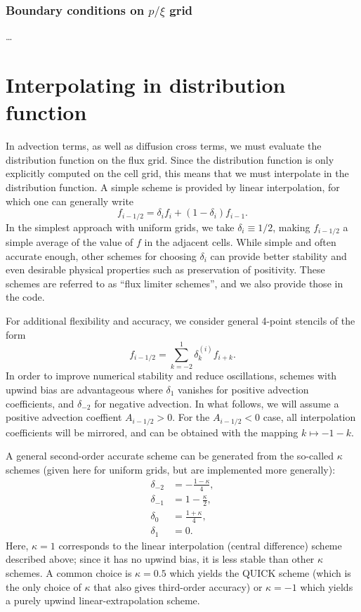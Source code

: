 \documentclass{notes}
\begin{document}
	\subsubsection{Boundary conditions on $p/\xi$ grid}
	\ldots

    \section{Interpolating in distribution function}\label{sec:interp}
    In advection terms, as well as diffusion cross terms, we must evaluate the
    distribution function on the flux grid. Since the distribution function is
    only explicitly computed on the cell grid, this means that we must
    interpolate in the distribution function. A simple scheme is provided by 
    linear interpolation, for which one can generally write
    \begin{equation}
        f_{i-1/2} = \delta_{i} f_i + \left( 1 - \delta_i \right) f_{i-1}.
    \end{equation}
    In the simplest approach with uniform grids, we take $\delta_i\equiv 1/2$, making $f_{i-1/2}$
    a simple average of the value of $f$ in the adjacent cells. While simple and
    often accurate enough, other schemes for choosing $\delta_i$ can provide
    better stability and even desirable physical properties such as preservation
    of positivity. These schemes are referred to as ``flux limiter schemes'',
    and we also provide those in the code.
    
    For additional flexibility and accuracy, we consider general 4-point stencils of the form
    \begin{equation}
    	f_{i-1/2} = \sum_{k=-2}^1 \delta^{(i)}_k f_{i+k}.
    \end{equation}
    In order to improve numerical stability and reduce oscillations, schemes with 
    upwind bias are advantageous where $\delta_{1}$ vanishes for positive 
    advection coefficients, and $\delta_{-2}$ for negative advection. In what follows,
    we will assume a positive advection coeffient $A_{i-1/2}>0$. For the $A_{i-1/2}<0$ 
    case, all interpolation coefficients will be mirrored, and can be obtained with the 
    mapping $k \mapsto -1 - k$.
    
    A general second-order accurate scheme can be generated from the so-called
    $\kappa$ schemes (given here for uniform grids, but are implemented more generally):
    \begin{align*}
    \delta_{-2} &= -\frac{1-\kappa}{4}, \nonumber \\
    \delta_{-1} &= 1 - \frac{\kappa}{2}, \nonumber \\
    \delta_0 &= \frac{1+\kappa}{4}, \nonumber \\
    \delta_1 &= 0.
    \end{align*}
    Here, $\kappa = 1$ corresponds to the linear interpolation (central difference) 
    scheme described above; since it has no upwind bias, it is less stable than other 
    $\kappa$ schemes. A common choice is $\kappa=0.5$ which yields the QUICK 
    scheme (which is the only choice of $\kappa$ that also gives third-order accuracy) 
    or $\kappa=-1$ which yields a purely upwind linear-extrapolation scheme.
\end{document}
